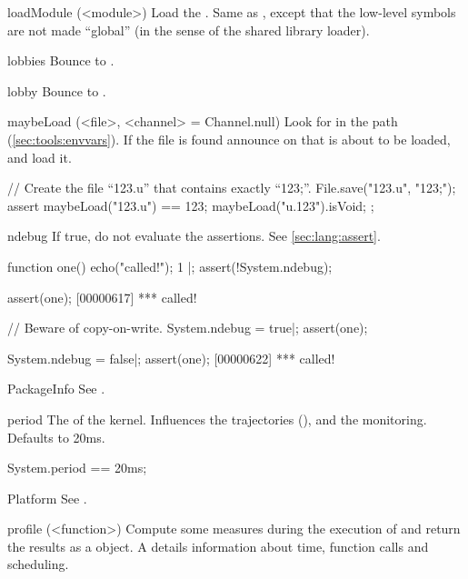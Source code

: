 \begin{urbiscriptapi}
\item[loadModule](<module>)%
  Load the \UObject {}.  Same as , except
  that the low-level \Cxx symbols are not made ``global'' (in the sense of
  the shared library loader).


\item[lobbies] Bounce to .


\item[lobby] Bounce to .


\item[maybeLoad](<file>, <channel> = Channel.null)%
  Look for  in the \urbi path (\autoref{sec:tools:envvars}).
  If the file is found announce on  that  is
  about to be loaded, and load it.

\begin{urbiscript}
// Create the file ``123.u'' that contains exactly ``123;''.
File.save("123.u", "123;");
assert
{
  maybeLoad("123.u") == 123;
  maybeLoad("u.123").isVoid;
};
\end{urbiscript}


\item[ndebug] If true, do not evaluate the assertions.  See
  \autoref{sec:lang:assert}.
\begin{urbiscript}
function one() { echo("called!"); 1 }|;
assert(!System.ndebug);

assert(one);
[00000617] *** called!

// Beware of copy-on-write.
System.ndebug = true|;
assert(one);

System.ndebug = false|;
assert(one);
[00000622] *** called!
\end{urbiscript}




\item[PackageInfo] See .


\item[period] The  of the \urbi kernel.  Influences the
  trajectories (), and the \UObject
  monitoring.  Defaults to 20ms.
\begin{urbiassert}
System.period == 20ms;
\end{urbiassert}


\item[Platform] See .


\item[profile](<function>)%
  Compute some measures during the execution of  and return
  the results as a  object. A  details
  information about time, function calls and scheduling.



\end{urbiscriptapi}
